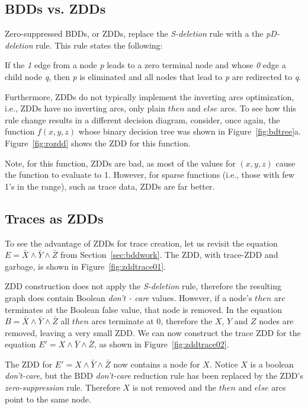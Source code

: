 {\subsection{BDDs vs. ZDDs}

Zero-suppressed BDDs, or ZDDs, replace the \textit{S-deletion} rule with a the \textit{pD-deletion} rule.  This rule states the following: \begin{itemize}

 If the \textit{1} edge from a node \textit{p} leads to a zero
 terminal node and whose \textit{0} edge a child node \textit {q}, then \textit{p} is eliminated and all nodes that lead to \textit{p} are redirected to \textit{q}.

\end{itemize}

Furthermore, ZDDs do not typically implement the inverting arcs optimization, i.e., ZDDs have no inverting arcs, only plain $then$ and $else$ arcs.  To see how this rule change results in a different decision diagram, consider, once again, the function $f(x,y,z)$ whose binary decision tree was shown in Figure~\ref{fig:bdtree}a. Figure~\ref{fig:rozdd} shows the ZDD for this function.

Note, for this function, ZDDs are bad, as most of the values for $(x,y,z)$ cause the function to evaluate to 1.  However, for sparse functions (i.e., those with few 1's in the range), such as trace data, ZDDs are far better.

\subsection{Traces as ZDDs}

To see the advantage of ZDDs for trace creation, let us revisit the equation $E = \bar{X}\land\bar{Y}\land\bar{Z}$ from Section~\ref{sec:bddwork}.  The ZDD, with trace-ZDD and garbage, is shown in Figure~\ref{fig:zddtrace01}.

ZDD construction does not apply the \textit{S-deletion} rule, therefore the resulting graph does contain Boolean \textit{don't - care} values. However, if a node's $then$ arc terminates at the Boolean false value, that node is removed.  In the equation $B = \bar{X}\land\bar{Y}\land\bar{Z}$ all $then$ arcs terminate at 0, therefore the $X$, $Y$ and $Z$ nodes are removed, leaving a very small ZDD. We can now construct the trace ZDD for the equation $E' = X\land\bar{Y}\land\bar{Z}$, as shown in Figure~\ref{fig:zddtrace02}.

The ZDD for $E' = X\land\bar{Y}\land\bar{Z}$ now contains a node for $X$.  Notice $X$ is a boolean \textit{don't-care}, but the BDD \textit{don't-care} reduction rule has been replaced by the ZDD's \textit{zero-suppression} rule.  Therefore $X$ is not removed and the $then$ and $else$ arcs point to the same node.

}
